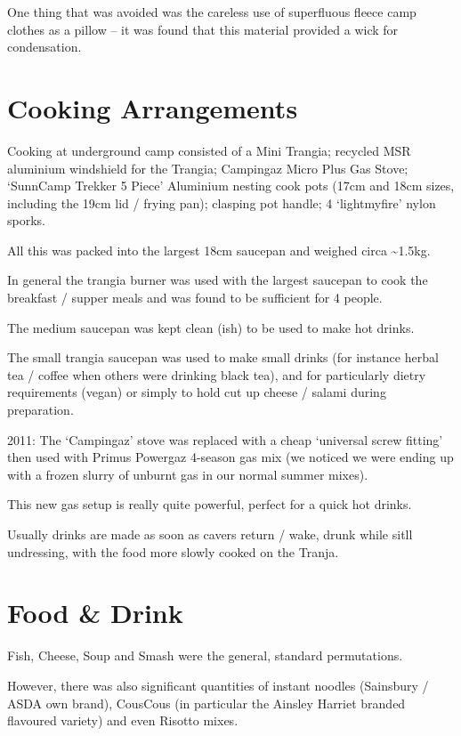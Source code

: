One thing that was avoided was the careless use of superfluous fleece
camp clothes as a pillow -- it was found that this material provided a
wick for condensation.

\hypertarget{cooking-arrangements}{%
\section{Cooking Arrangements}\label{cooking-arrangements}}

Cooking at underground camp consisted of a Mini Trangia; recycled MSR
aluminium windshield for the Trangia; Campingaz Micro Plus Gas Stove;
`SunnCamp Trekker 5 Piece' Aluminium nesting cook pots (17cm and 18cm
sizes, including the 19cm lid / frying pan); clasping pot handle; 4
`lightmyfire' nylon sporks.

All this was packed into the largest 18cm saucepan and weighed circa
\textasciitilde{}1.5kg.

In general the trangia burner was used with the largest saucepan to cook
the breakfast / supper meals and was found to be sufficient for 4
people.

The medium saucepan was kept clean (ish) to be used to make hot drinks.

The small trangia saucepan was used to make small drinks (for instance
herbal tea / coffee when others were drinking black tea), and for
particularly dietry requirements (vegan) or simply to hold cut up cheese
/ salami during preparation.

2011: The `Campingaz' stove was replaced with a cheap `universal screw
fitting' then used with Primus Powergaz 4-season gas mix (we noticed we
were ending up with a frozen slurry of unburnt gas in our normal summer
mixes).

This new gas setup is really quite powerful, perfect for a quick hot
drinks.

Usually drinks are made as soon as cavers return / wake, drunk while
sitll undressing, with the food more slowly cooked on the Tranja.

\hypertarget{food-drink}{%
\section{Food \& Drink}\label{food-drink}}

Fish, Cheese, Soup and Smash were the general, standard permutations.

However, there was also significant quantities of instant noodles
(Sainsbury / ASDA own brand), CousCous (in particular the Ainsley
Harriet branded flavoured variety) and even Risotto mixes.

